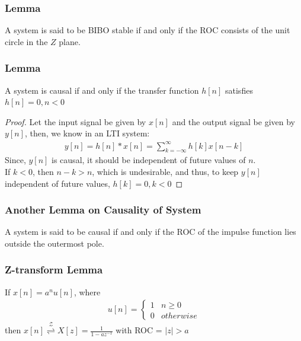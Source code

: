 \documentclass{beamer}
\providecommand{\ztrans}{\overset{\mathcal{Z}}{ \rightleftharpoons}}
\providecommand{\abs}[1]{\left\vert#1\right\vert}
\begin{document}
\begin{frame}[fragile]
\frametitle{Lemma}
\begin{flushleft}
\begin{lemma}
A system is said to be BIBO stable if and only if the ROC consists of the unit circle in the $Z$ plane.
\end{lemma}
\end{flushleft}

\end{frame}


\begin{frame}[fragile]
\frametitle{Lemma}
\begin{flushleft}
\begin{lemma}
A system is causal if and only if the transfer function $h[n]$ satisfies $h[n] = 0 , n<0$
\end{lemma}
\begin{proof}
Let the input signal be given by $x[n]$ and the output signal be given by $y[n]$, then, we know in an LTI system:
\begin{align}
    y[n] = h[n] * x[n] = \sum_{k = -\infty}^\infty h[k]x[n-k]
\end{align}
Since, $y[n]$ is causal, it should be independent of future values of $n$. \\
If $k < 0$, then $n - k > n$, which is undesirable, and thus, to keep $y[n]$ independent of future values, $h[k] = 0 , k< 0$
\end{proof}
\end{flushleft}

\end{frame}


\begin{frame}[fragile]
\frametitle{Another Lemma on Causality of System}
\begin{flushleft}
\begin{lemma}
A  system  is  said  to  be  causal  if  and only if the ROC of the impulse function lies outside the outermost pole.
\label{Causal}
\end{lemma}
\end{flushleft}

\end{frame}

\begin{frame}[fragile]
\frametitle{Z-transform Lemma}
\begin{flushleft}
\begin{lemma}
If $x[n] = a^nu[n]$, where 
\begin{align}
    u[n] = 
    \begin{cases}
    1 & n \geq 0\\
    0 & otherwise
    \end{cases}
\end{align}
then $x[n] \ztrans X[z] = \frac{1}{1 - az^{-1}}$ with ROC = $\abs{z}>a$
\label{z-transform}
\end{lemma}
\end{flushleft}

\end{frame}
\end{document}
